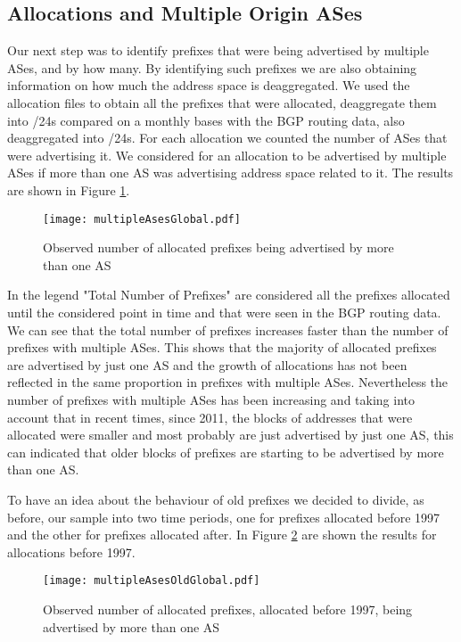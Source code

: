 \documentclass[11pt,a4paper]{scrreprt}
\begin{document}
\subsection{Allocations and Multiple Origin ASes}

Our next step was to identify prefixes that were being advertised by multiple ASes, and by how many. By identifying such prefixes we are also obtaining information on how much the address space is deaggregated. 
We used the allocation files to obtain all the prefixes that were allocated, deaggregate them into /24s compared on a monthly bases with the BGP routing data, also deaggregated into /24s. For each allocation we counted the number of ASes that were advertising it. We considered for an allocation to be advertised by multiple ASes if more than one AS was advertising address space related to it. The results are shown in Figure \ref{fig:multipleAsesGlobal}.

\begin{figure}[!h]
\centering
\texttt{[image: multipleAsesGlobal.pdf]}
\caption{Observed number of allocated prefixes being advertised by more than one AS}
\label{fig:multipleAsesGlobal}
\end{figure}

In the legend "Total Number of Prefixes" are considered all the prefixes allocated until the considered point in time and that were seen in the BGP routing data.
We can see that the total number of prefixes increases faster than the number of prefixes with multiple ASes. This shows that the majority of allocated prefixes are advertised by just one AS and the growth of allocations has not been reflected in the same proportion in prefixes with multiple ASes. Nevertheless the number of prefixes with multiple ASes has been increasing and taking into account that in recent times, since 2011, the blocks of addresses that were allocated were smaller and most probably are just advertised by just one AS, this can indicated that older blocks of prefixes are starting to be advertised by more than one AS. 

To have an idea about the behaviour of old prefixes we decided to divide, as before, our sample into two time periods, one for prefixes allocated before 1997 and the other for prefixes allocated after. In Figure \ref{fig:multipleAsesOldGlobal} are shown the results for allocations before 1997.

\begin{figure}[!h]
\centering
\texttt{[image: multipleAsesOldGlobal.pdf]}
\caption{Observed number of allocated prefixes, allocated before 1997, being advertised by more than one AS}
\label{fig:multipleAsesOldGlobal}
\end{figure}
\end{document}
